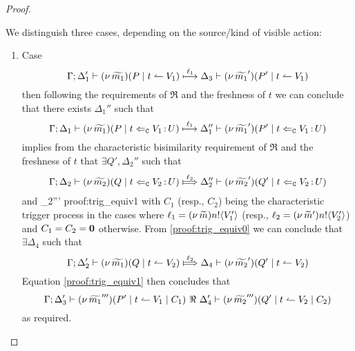 \begin{proof}
\begin{enumerate}
			We distinguish three cases, depending on the source/kind of visible action: 
				\begin{enumerate}
					\item	Case
						\[
							\Gamma; \Delta_1' \vdash (\nu\, \widetilde{m_1})(P \;|\; t \leftharpoonup V_1) \stackrel{\ell_1}{\longmapsto} \Delta_3 \vdash (\nu\, \widetilde{m_1}')(P' \;|\; t \leftharpoonup V_1)
						\]
							then following the requirements of $\Re$ and the freshness of $t$
							we can conclude that there exists $\Delta_1''$ such that
						\[
							\Gamma; \Delta_1 \vdash (\nu\, \widetilde{m_1})(P \;|\; t \Leftarrow_{\mathtt{C}} V_1{\,:\,}U) \stackrel{\ell_1}{\longmapsto} \Delta_1'' \vdash (\nu\, \widetilde{m_1}')(P' \;|\; t \Leftarrow_{\mathtt{C}} V_1{\,:\,}U)
						\]
							implies from the characteristic bisimilarity requirement of $\Re$ and
							the freshness of $t$ that $\exists Q', \Delta_2''$ such that
							\begin{eqnarray}
							\horel{\Gamma}{\Delta_2}{\newsp{\widetilde{m_2}}{Q \Par \ftrigger{t}{V_2}{U}}}
							{\Hby{\ell_2}}
							{\Delta_2''}{\newsp{\widetilde{m_2}'}{Q' \Par \ftrigger{t}{V_2}{U}}}
							\label{proof:trig_equiv0}
							\end{eqnarray}
							and
							{\fwb}
							{\Delta_2'''}{}
							{proof:trig_equiv1}
							with $C_1$ (resp., $C_2$) being the characteristic trigger process
							in the cases where $\ell_1 = (\nu\, \widetilde{m}) n ! \langle V_1' \rangle$ (resp., $\ell_2 = (\nu\, \widetilde{m}') n ! \langle V_2' \rangle$)
							and $C_1 = C_2 = \mathbf{0}$ otherwise.
							From \eqref{proof:trig_equiv0} we can conclude that $\exists \Delta_4$ such that
						\[
							\horel{\Gamma}{\Delta_2'}{\newsp{\widetilde{m_1}}{Q \Par \ntrigger{t}{V_2}}}
							{\Hby{\ell_2}}
							{\Delta_4}{\newsp{\widetilde{m_2}'}{Q' \Par \ntrigger{t}{V_2}}}
						\]
							Equation \eqref{proof:trig_equiv1} then concludes that
						\[
							\Gamma; \Delta_3' \vdash (\nu\, \widetilde{m_1}''')(P' \;|\; t \leftharpoonup V_1 \;|\; C_1) \ \Re\  \Delta_4' \vdash{(\nu\, \widetilde{m_2}''')(Q' \;|\;t \leftharpoonup V_2 \;|\;C_2)}
						\]
							as required.


\end{enumerate}
\end{enumerate}
\end{proof}

